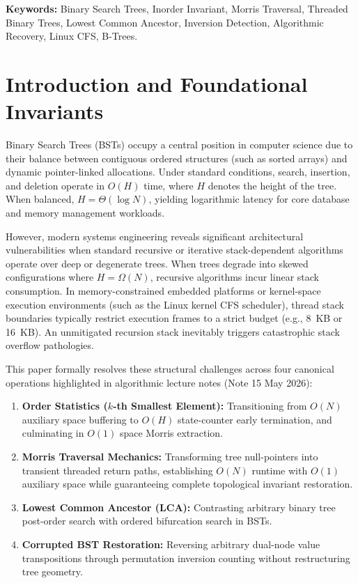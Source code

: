 \documentclass[10pt,twocolumn,letterpaper]{article}
\begin{document}
\vspace{1.0em}
\noindent\textbf{Keywords:} Binary Search Trees, Inorder Invariant, Morris Traversal, Threaded Binary Trees, Lowest Common Ancestor, Inversion Detection, Algorithmic Recovery, Linux CFS, B-Trees.
\vspace{1.2em}

\section{Introduction and Foundational Invariants}
\label{sec:intro}

Binary Search Trees (BSTs) occupy a central position in computer science due to their balance between contiguous ordered structures (such as sorted arrays) and dynamic pointer-linked allocations. Under standard conditions, search, insertion, and deletion operate in $O(H)$ time, where $H$ denotes the height of the tree. When balanced, $H = \Theta(\log N)$, yielding logarithmic latency for core database and memory management workloads.

However, modern systems engineering reveals significant architectural vulnerabilities when standard recursive or iterative stack-dependent algorithms operate over deep or degenerate trees. When trees degrade into skewed configurations where $H = \Omega(N)$, recursive algorithms incur linear stack consumption. In memory-constrained embedded platforms or kernel-space execution environments (such as the Linux kernel CFS scheduler), thread stack boundaries typically restrict execution frames to a strict budget (e.g., 8~KB or 16~KB). An unmitigated recursion stack inevitably triggers catastrophic stack overflow pathologies.

This paper formally resolves these structural challenges across four canonical operations highlighted in algorithmic lecture notes (Note 15 May 2026):
\begin{enumerate}
    \item \textbf{Order Statistics ($k$-th Smallest Element):} Transitioning from $O(N)$ auxiliary space buffering to $O(H)$ state-counter early termination, and culminating in $O(1)$ space Morris extraction.
    \item \textbf{Morris Traversal Mechanics:} Transforming tree null-pointers into transient threaded return paths, establishing $O(N)$ runtime with $O(1)$ auxiliary space while guaranteeing complete topological invariant restoration.
    \item \textbf{Lowest Common Ancestor (LCA):} Contrasting arbitrary binary tree post-order search with ordered bifurcation search in BSTs.
    \item \textbf{Corrupted BST Restoration:} Reversing arbitrary dual-node value transpositions through permutation inversion counting without restructuring tree geometry.
\end{enumerate}
\end{document}
